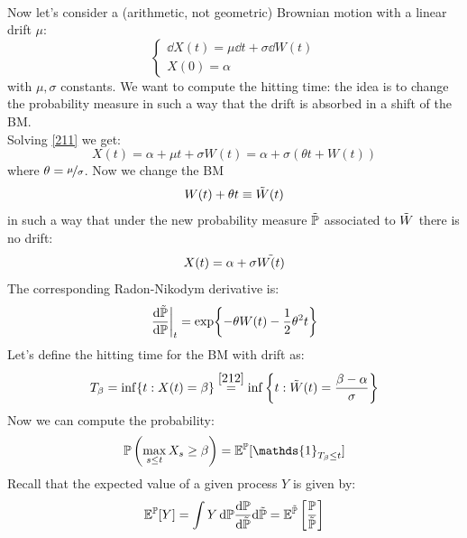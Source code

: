 \\ Now let's consider a (arithmetic, not geometric) Brownian motion with a linear drift $\mu$:
\begin{equation}\label{211}
    \begin{cases}
    \dd X(t) = \mu\dd t + \sigma\dd W(t) \\
    X(0) = \alpha
    \end{cases}
\end{equation}
with $\mu,\sigma$ constants. We want to compute the hitting time: the idea is to change the probability measure in such a way that the drift is absorbed in a shift of the BM. \\
Solving \eqref{211} we get:
\begin{equation}
    X(t) = \alpha + \mu t + \sigma W(t) = \alpha + \sigma\left(\theta t + W(t)\right)
\end{equation}
where $\theta = \nicefrac{\mu}{\sigma}$. Now we change the BM
\begin{equation}\label{ww}
    W(t)+\theta t \equiv \Tilde{W}(t)
\end{equation}
in such a way that under the new probability measure $\Tilde{\mathbb{P}}$ associated to $\Tilde{W}$ there is no drift:
\begin{equation}\label{212}
    X(t) = \alpha + \sigma\Tilde{W(t)}
\end{equation}
The corresponding Radon-Nikodym derivative is:
\begin{equation} %
    \eval{\frac{\dd\Tilde{\Pmeas}}{\dd\Pmeas}}_t = \exp{-\theta W(t) - \frac{1}{2}\theta^2 t}
\end{equation}
Let's define the hitting time for the BM with drift as:
\begin{equation}
    T_{\beta} = \inf\{t:X(t)=\beta\} \overset{\eqref{212}}{=} \inf\bigg\{t: \Tilde{W}(t) = \frac{\beta-\alpha}{\sigma}\bigg\}
\end{equation}
Now we can compute the probability:
\begin{align}\label{213}
    \Pmeas\left(\max_{s\le t}X_s \ge \beta\right) = \mathbb{E}^{\Pmeas}[\mathds{1}_{T_{\beta}\le t}] 
\end{align}
Recall that the expected value of a given process $Y$ is given by:
\begin{equation*}
    \mathbb{E}^{\mathbb{P}}[Y] = \int Y\,\dd\mathbb{P} \dfrac{\dd\mathbb{P}}{\dd\Tilde{\mathbb{P}}}\dd\Tilde{\mathbb{P}} = \mathbb{E}^{\Tilde{\mathbb{P}}}\left[\frac{\mathbb{P}}{\Tilde{\mathbb{P}}}\right]
\end{equation*}
